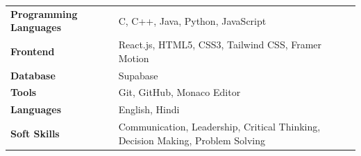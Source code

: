 \documentclass[11pt,a4paper]{article}
\begin{document}
\begin{tabular}{>{\bfseries}p{4cm}p{11cm}}

Programming Languages & C, C++, Java, Python, JavaScript \\

Frontend & React.js, HTML5, CSS3, Tailwind CSS, Framer Motion \\

Database & Supabase \\

Tools & Git, GitHub, Monaco Editor \\

Languages & English, Hindi \\

Soft Skills & Communication, Leadership, Critical Thinking, Decision Making, Problem Solving \\

\end{tabular}
\end{document}
